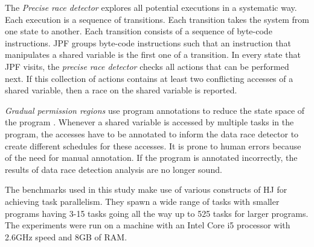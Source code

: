 The \textit{Precise race detector} explores all potential executions in a systematic way. Each execution is a sequence of transitions. Each transition takes the system from one state to another. Each transition consists of a sequence of byte-code instructions. JPF groups byte-code instructions such that an instruction that manipulates a shared variable is the first one of a transition. In every state that JPF visits, the \textit{precise race detector} checks all actions that can be performed next. If this collection of actions contains at least two conflicting accesses of a shared variable, then a race on the shared variable is reported.

\textit{Gradual permission regions} use program annotations to reduce the state space of the program \cite{mercer2015model}. Whenever a shared variable is accessed by multiple tasks in the program, the accesses have to be annotated to inform the data race detector to create different schedules for these accesses. It is prone to human errors because of the need for manual annotation. If the program is annotated incorrectly, the results of data race detection analysis are no longer sound.

The benchmarks used in this study make use of various constructs of HJ for achieving task parallelism. They spawn a wide range of tasks with smaller programs having 3-15 tasks going all the way up to 525 tasks for larger programs. The experiments were run on a machine with an Intel Core i5 processor with 2.6GHz speed and 8GB of RAM.

